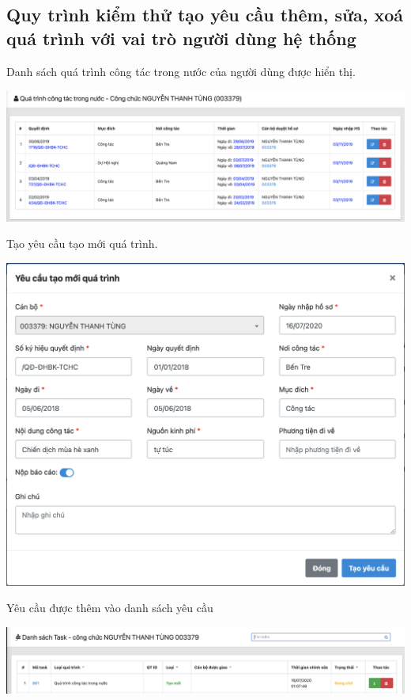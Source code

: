 \subsection{Quy trình kiểm thử tạo yêu cầu thêm, sửa, xoá quá trình với vai trò người dùng hệ thống}
\noindent Danh sách quá trình công tác trong nước của người dùng được hiển thị.
\begin{center}
  \captionsetup{type=figure}
  \includegraphics[width=15cm]{img/test/userView.png}
\end{center}
\noindent Tạo yêu cầu tạo mới quá trình.
\begin{center}
  \captionsetup{type=figure}
  \includegraphics[width=15cm]{img/test/userForm.png}
\end{center}
Yêu cầu được thêm vào danh sách yêu cầu
\begin{center}
  \captionsetup{type=figure}
  \includegraphics[width=15cm]{img/test/userTask.png}
\end{center}
